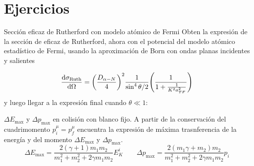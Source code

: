 \section*{Ejercicios}




\begin{Ejercicio}{Sección eficaz de Rutherford con modelo atómico de Fermi} \label{Ej:02.01}
    Obten la expresión de la sección de eficaz de Rutherford, ahora con el potencial del modelo atómico estadístico de Fermi, usando la aproximación de Born con ondas planas incidentes y salientes

    \begin{equation*}
        \dv{\sigma_{\Ruth}}{\Omega} =  \pqty{\frac{D_{\alpha-N}}{4}}^2 \frac{1}{\sin^4 \theta/2} \pqty{\frac{1}{1+\frac{1}{K^2 a_{TF}^2}}}
    \end{equation*}
    y luego llegar a la expresión final cuando $\theta\ll 1$: 
\end{Ejercicio}

\begin{Ejercicio}{$\Delta E_{\max}$ y $\Delta p_{\max}$ en colisión con blanco fijo.} \label{Ej:02.02}
    A partir de la conservación del cuadrimomento $p^{\mu}_i = p^{\mu}_f$ encuentra la expresión de máxima trasnferencia de la energía y del momento $\Delta E_{\max}$ y $\Delta p_{\max}$. 
    \begin{equation}
        \Delta E_{\max} = \frac{2(\gamma+1)m_1m_2}{m_1^2 + m_2^2 + 2 \gamma m_1 m_2} E_K^i \qquad 
        \Delta p_{\max} = \frac{2(m_1\gamma+m_2)m_2}{m_1^2 + m_2^2 + 2 \gamma m_1 m_2} p_i 
    \end{equation}
\end{Ejercicio}

